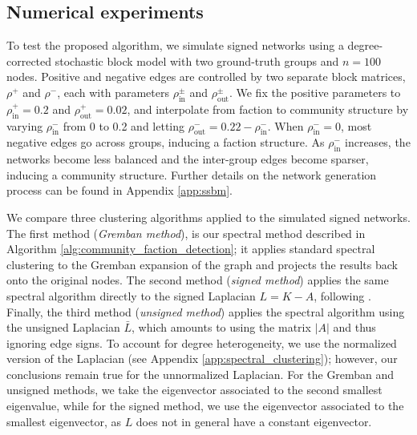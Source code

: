 \documentclass[reprint,onecolumn]{article}
\newcommand{\1}{\mathbb{1}}
\newcommand{\0}{\mathbf{0}}
\begin{document}
\subsection{Numerical experiments}  \label{sec:numerical}

To test the proposed algorithm, we simulate signed networks using a degree-corrected stochastic block model with two ground-truth groups and $n=100$ nodes. Positive and negative edges are controlled by two separate block matrices, \(\rho^+\) and \(\rho^-\), each with parameters \(\rho^{\pm}_{\text{in}}\) and \(\rho^{\pm}_{\text{out}}\). We fix the positive parameters to \(\rho^+_{\text{in}} = 0.2\) and \(\rho^+_{\text{out}} = 0.02\), and interpolate from faction to community structure by varying \(\rho^-_{\text{in}}\) from 0 to 0.2 and letting \(\rho^-_{\text{out}} = 0.22 - \rho^-_{\text{in}}\). When \(\rho^-_{\text{in}} = 0\), most negative edges go across groups, inducing a faction structure. As \(\rho^-_{\text{in}}\) increases, the networks become less balanced and the inter-group edges become sparser, inducing a community structure. Further details on the network generation process can be found in Appendix \ref{app:ssbm}.

We compare three clustering algorithms applied to the simulated signed networks. The first method (\emph{Gremban method}), 
is our spectral method described in Algorithm \ref{alg:community_faction_detection}; it applies standard spectral clustering to the Gremban expansion of the graph and projects the results back onto the original nodes. The second method (\textit{signed method}) applies the same spectral algorithm directly to the signed Laplacian $L = K- A$, following \cite{kunegis2010spectral}. Finally, the third method (\textit{unsigned method}) applies the spectral algorithm using the unsigned Laplacian $\bar L$, which amounts to using the matrix \(|A|\) and thus ignoring edge signs. To account for degree heterogeneity, we use the normalized version of the Laplacian (see Appendix \ref{app:spectral_clustering}); however, our conclusions remain true for the unnormalized Laplacian.  For the Gremban and unsigned methods, we take the eigenvector associated to the second smallest eigenvalue, while for the signed method, we use the eigenvector associated to the smallest eigenvector, as $L$ does not in general have a constant eigenvector.
\end{document}
